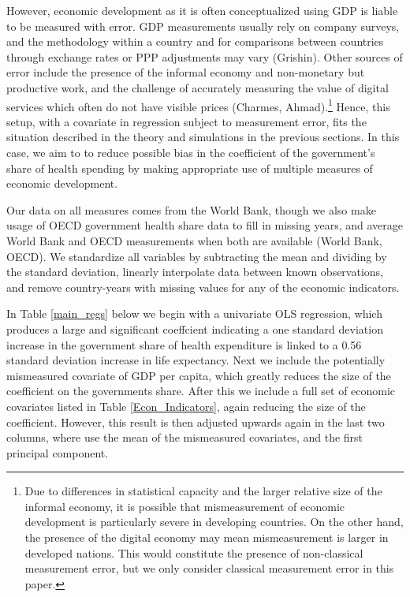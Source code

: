 \documentclass[12pt]{article}
\begin{document}
        However, economic development as it is often conceptualized using GDP is liable to be measured with error. GDP measurements usually rely on company surveys, and the methodology within a country and for comparisons between countries through exchange rates or PPP adjustments may vary (Grishin). Other sources of error include the presence of the informal economy and non-monetary but productive work, and the challenge of accurately measuring the value of digital services which often do not have visible prices (Charmes, Ahmad).\footnote{Due to differences in statistical capacity and the larger relative size of the informal economy, it is possible that mismeasurement of economic development is particularly severe in developing countries. On the other hand, the presence of the digital economy may mean mismeasurement is larger in developed nations. This would constitute the presence of non-classical measurement error, but we only consider classical measurement error in this paper.} Hence, this setup, with a covariate in regression subject to measurement error, fits the situation described in the theory and simulations in the previous sections. In this case, we aim to to reduce possible bias in the coefficient of the government's share of health spending by making appropriate use of multiple measures of economic development.


        Our data on all measures comes from the World Bank, though we also make usage of OECD government health share data to fill in missing years, and average World Bank and OECD measurements when both are available (World Bank, OECD). We standardize all variables by subtracting the mean and dividing by the standard deviation, linearly interpolate data between known observations, and remove country-years with missing values for any of the economic indicators.


        In Table \ref{main_regs} below we begin with a univariate OLS regression, which produces a large and significant coeffcient indicating a one standard deviation increase in the government share of health expenditure is linked to a 0.56 standard deviation increase in life expectancy. Next we include the potentially mismeasured covariate of GDP per capita, which greatly reduces the size of the coefficient on the governments share. After this we include a full set of economic covariates listed in Table \ref{Econ_Indicators}, again reducing the size of the coefficient. However, this result is then adjusted upwards again in the last two columns, where use the mean of the mismeasured covariates, and the first principal component.
\end{document}

